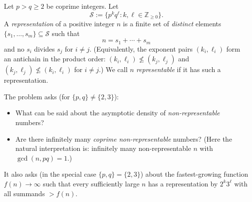 Let $p>q\ge 2$ be coprime integers.
Let
\[\mathcal{S} := \{p^k q^\ell : k,\ell\in\mathbb{Z}_{\ge 0}\}.\]
A \emph{representation} of a positive integer $n$ is a finite set of \emph{distinct} elements $\{s_1,\dots,s_m\}\subseteq\mathcal{S}$ such that
\[n=s_1+\cdots+s_m\]
and no $s_i$ divides $s_j$ for $i\ne j$.
(Equivalently, the exponent pairs $(k_i,\ell_i)$ form an antichain in the product order: $(k_i,\ell_i)\not\le (k_j,\ell_j)$ and $(k_j,\ell_j)\not\le (k_i,\ell_i)$ for $i\ne j$.)
We call $n$ \emph{representable} if it has such a representation.

The problem asks (for $\{p,q\}\ne\{2,3\}$):
\begin{itemize}
\item What can be said about the asymptotic density of \emph{non-representable} numbers?
\item Are there infinitely many \emph{coprime non-representable} numbers?
(Here the natural interpretation is: infinitely many non-representable $n$ with $\gcd(n,pq)=1$.)
\end{itemize}

It also asks (in the special case $\{p,q\}=\{2,3\}$) about the fastest-growing function $f(n)\to\infty$ such that every sufficiently large $n$ has a representation by $2^k3^\ell$ with all summands $>f(n)$.
